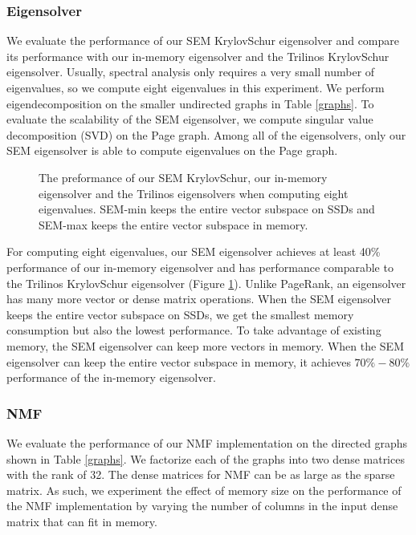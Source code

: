 \subsubsection{Eigensolver}

We evaluate the performance of our SEM KrylovSchur eigensolver and compare
its performance
with our in-memory eigensolver and the Trilinos KrylovSchur eigensolver.
Usually, spectral analysis \cite{} only requires a very small number of
eigenvalues, so we compute eight eigenvalues in this experiment. We perform
eigendecomposition on the smaller undirected graphs
in Table \ref{graphs}. To evaluate the scalability of the SEM eigensolver,
we compute singular value decomposition (SVD) on the Page graph. Among all of
the eigensolvers, only our SEM eigensolver is able to compute eigenvalues
on the Page graph.

\begin{figure}
	\begin{center}
		\footnotesize
		
		\caption{The preformance of our SEM KrylovSchur, our in-memory eigensolver
			and the Trilinos eigensolvers when computing eight
			eigenvalues. SEM-min keeps the entire vector subspace on SSDs and
		SEM-max keeps the entire vector subspace in memory.}
		\label{fig:eigen}
	\end{center}
\end{figure}

For computing eight eigenvalues, our SEM eigensolver achieves at least 40\%
performance of our in-memory eigensolver and has performance comparable to
the Trilinos KrylovSchur eigensolver (Figure \ref{fig:eigen}). Unlike PageRank,
an eigensolver has many more vector or dense matrix operations. When the SEM
eigensolver keeps the entire vector subspace on SSDs, we get the smallest
memory consumption but also the lowest performance. To take advantage of
existing memory, the SEM eigensolver can keep more vectors in memory.
When the SEM eigensolver can keep the entire vector subspace in memory,
it achieves $70\%-80\%$ performance of the in-memory eigensolver.

\subsubsection{NMF}
We evaluate the performance of our NMF implementation on the directed graphs
shown in Table \ref{graphs}. We factorize each of the graphs into two dense
matrices with the rank of 32. The dense matrices for NMF can be as large as
the sparse matrix. As such, we experiment the effect of memory size on
the performance of the NMF implementation by varying the number of columns
in the input dense matrix that can fit in memory.

